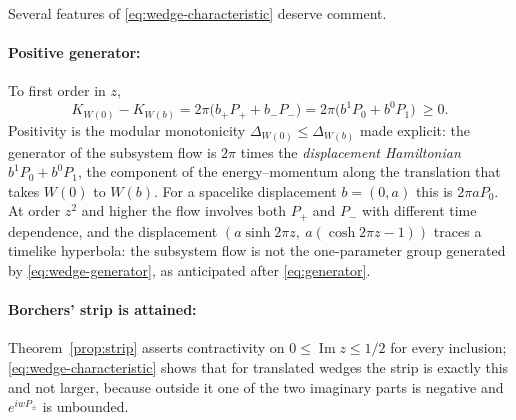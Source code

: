 \documentclass[a4paper,11pt]{article}
\theoremstyle{definition}
\begin{document}
Several features of \eqref{eq:wedge-characteristic} deserve comment.

\paragraph{Positive generator:} To first order in $z$,
\begin{equation}
 K_{W(0)}-K_{W(b)}=2\pi\bigl(b_+P_++b_-P_-\bigr)=2\pi\bigl(b^1P_0+b^0P_1\bigr)\ \ge0 .
 \label{eq:wedge-generator}
\end{equation}
Positivity is the modular monotonicity $\Delta_{W(0)}\le\Delta_{W(b)}$ made explicit: the generator of the subsystem flow is $2\pi$ times the \emph{displacement Hamiltonian} $b^1P_0+b^0P_1$, the component of the energy--momentum along the translation that takes $W(0)$ to $W(b)$. For a spacelike displacement $b=(0,a)$ this is $2\pi aP_0$. At order $z^2$ and higher the flow involves both $P_+$ and $P_-$ with different time dependence, and the displacement $(a\sinh2\pi z,\ a(\cosh2\pi z-1))$ traces a timelike hyperbola: the subsystem flow is not the one-parameter group generated by \eqref{eq:wedge-generator}, as anticipated after \eqref{eq:generator}.

\paragraph{Borchers' strip is attained:} Theorem~\ref{prop:strip} asserts contractivity on $0\le\operatorname{Im}z\le1/2$ for every inclusion; \eqref{eq:wedge-characteristic} shows that for translated wedges the strip is exactly this and not larger, because outside it one of the two imaginary parts is negative and $e^{iwP_\pm}$ is unbounded.
\end{document}
